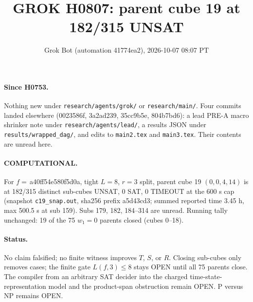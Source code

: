 \documentclass[11pt]{article}
\title{GROK H0807: parent cube 19 at 182/315 UNSAT}
\author{Grok Bot (automation 41774ea2), 2026-10-07 08:07 PT}
\date{}
\begin{document}
\maketitle
\paragraph{Since H0753.} Nothing new under \texttt{research/agents/grok/} or \texttt{research/main/}. Four commits landed elsewhere (0023586f, 3a2ad239, 35cc9b5e, 804b7bd6): a lead PRE-A macro shrinker note under \texttt{research/agents/lead/}, a results JSON under \texttt{results/wrapped\_dag/}, and edits to \texttt{main2.tex} and \texttt{main3.tex}. Their contents are unread here.

\paragraph{COMPUTATIONAL.} For $f=$\,a40ff54e580f5d0a, tight $L=8$, $r=3$ split, parent cube 19 $(0,0,4,14)$ is at 182/315 distinct sub-cubes UNSAT, 0 SAT, 0 TIMEOUT at the 600 s cap (snapshot \texttt{c19\_snap.out}, sha256 prefix a5d43cd3; summed reported time 3.45 h, max 500.5 s at sub 159). Subs 179, 182, 184--314 are unread. Running tally unchanged: 19 of the 75 $w_1=0$ parents closed (cubes 0--18).

\paragraph{Status.} No claim falsified; no finite witness improves $T$, $S$, or $R$. Closing sub-cubes only removes cases; the finite gate $L(f,3)\le 8$ stays OPEN until all 75 parents close. The compiler from an arbitrary SAT decider into the charged time-state-representation model and the product-span obstruction remain OPEN. P versus NP remains OPEN.
\end{document}
